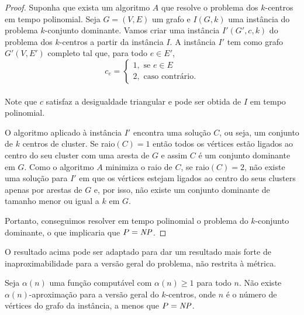 \begin{proof}
    Suponha que exista um algoritmo $A$ que resolve o problema dos $k$-centros em tempo polinomial. Seja $G = (V,E)$ um grafo e $I(G,k)$ uma instância do problema $k$-conjunto dominante. Vamos criar uma instância $I'(G',c,k)$ do problema dos $k$-centros a partir da instância $I$. A instância $I'$ tem como grafo $G'(V,E')$ completo tal que, para todo $e \in E'$, \\
    \[
    c_e = \begin{cases}
            1, \text{ se } e \in E \\
            2, \text{ caso contrário.} 
            \end{cases}\]\\
    Note que $c$ satisfaz a desigualdade triangular e pode ser obtida de $I$ em tempo polinomial.

    O algoritmo aplicado à instância $I'$ encontra uma solução $C$, ou seja, um conjunto de $k$ centros de cluster. Se raio$(C)=1$ então todos os vértices estão ligados ao centro do seu cluster com uma aresta de $G$ e assim $C$ é um conjunto dominante em $G$. 
    Como o algoritmo $A$ minimiza o raio de $C$, se raio$(C)=2$, não existe uma solução para $I'$ em que os vértices estejam ligados ao centro do seus clusters apenas por arestas de $G$ e, por isso, não existe um conjunto dominante de tamanho menor ou igual a $k$ em $G$.

    Portanto, conseguimos resolver em tempo polinomial o problema do $k$-conjunto dominante, o que implicaria que $P = \mathit{NP}$.
\end{proof}

O resultado acima pode ser adaptado para dar um resultado mais forte de inaproximabilidade para a versão geral do problema, não restrita à métrica.
\begin{theorem}
    Seja $\alpha(n)$ uma função computável com $\alpha(n)\geq 1$ para todo $n$. Não existe $\alpha(n)$-aproximação para a versão geral do $k$-centros, onde $n$ é o número de vértices do grafo da instância, a menos que $P=\mathit{NP}$.
\end{theorem}

